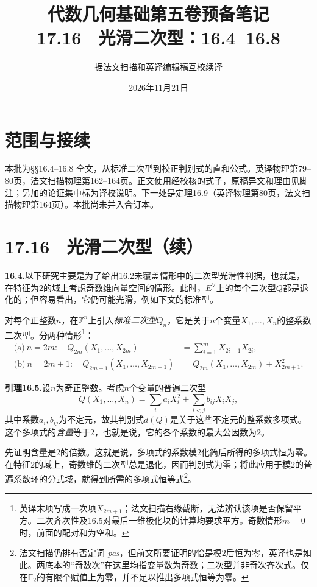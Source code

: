 \documentclass[openany,fontset=fandol]{ctexbook}
\begin{document}
\title{代数几何基础第五卷预备笔记\\17.16　光滑二次型：16.4--16.8}
\author{据法文扫描和英译编辑稿互校续译}
\date{2026年11月21日}
\maketitle
\chapter*{范围与接续}
本批为§§16.4--16.8 全文，从标准二次型到校正判别式的直和公式。英译物理第79--80页，法文扫描物理第162--164页。正文使用经校核的式子，原稿异文和理由见脚注；另加的论证集中标为译校说明。下一处是定理16.9（英译物理第80页，法文扫描物理第164页）。本批尚未并入合订本。

\chapter*{17.16　光滑二次型（续）}
\noindent\textbf{16.4.}\quad 以下研究主要是为了给出16.2未覆盖情形中的二次型光滑性判据，也就是，在特征为$2$的域上考虑奇数维向量空间的情形。此时，$E^\vee$上的每个二次型$Q$都是退化的；但容易看出，它仍可能光滑，例如下文的标准型。

对每个正整数$n$，在$\mathbb Z^n$上引入\emph{标准二次型}$Q_n$，它是关于$n$个变量$X_1,\ldots,X_n$的整系数二次型。分两种情形\footnote{英译末项写成一次项$X_{2m+1}$；法文扫描右缘截断，无法辨认该项是否保留平方。二次齐次性及16.5对最后一维极化块的计算均要求平方。奇数情形$m=0$时，前面的配对和为空和。}：
\begin{align*}
\text{(a)}\ n=2m:\quad
Q_{2m}(X_1,\ldots,X_{2m})&=\sum_{i=1}^{m}X_{2i-1}X_{2i},\\
\text{(b)}\ n=2m+1:\quad
Q_{2m+1}(X_1,\ldots,X_{2m+1})&=Q_{2m}(X_1,\ldots,X_{2m})+X_{2m+1}^2 .
\end{align*}


\noindent\textbf{引理16.5.}\quad 设$n$为奇正整数。考虑$n$个变量的普遍二次型
\[
Q(X_1,\ldots,X_n)=\sum_i a_i X_i^2+\sum_{i<j}b_{ij}X_iX_j,
\]
其中系数$a_i,b_{ij}$为不定元，故其判别式$d(Q)$是关于这些不定元的整系数多项式。这个多项式的\emph{含量}等于$2$，也就是说，它的各个系数的最大公因数为$2$。

先证明含量是$2$的倍数。这就是说，多项式的系数模$2$化简后所得的多项式恒为零。在特征$2$的域上，奇数维的二次型总是退化，因而判别式为零；将此应用于模$2$的普遍系数环的分式域，就得到所需的多项式恒等式\footnote{法文扫描仍排有否定词 \emph{pas}，但前文所要证明的恰是模$2$后恒为零，英译也是如此。两底本的“奇数次”在这里均指变量数为奇数；二次型并非奇次齐次式。仅在$\mathbb F_2$的有限个赋值上为零，并不足以推出多项式恒等为零。}。
\end{document}
